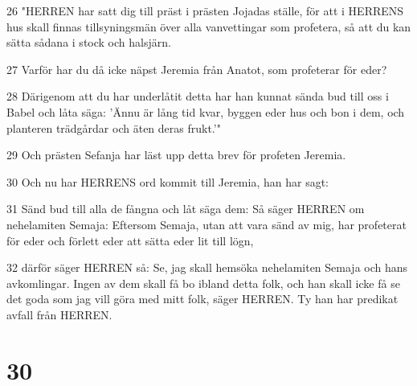 \par 26 "HERREN har satt dig till präst i prästen Jojadas ställe, för att i HERRENS hus skall finnas tillsyningsmän över alla vanvettingar som profetera, så att du kan sätta sådana i stock och halsjärn.
\par 27 Varför har du då icke näpst Jeremia från Anatot, som profeterar för eder?
\par 28 Därigenom att du har underlåtit detta har han kunnat sända bud till oss i Babel och låta säga: 'Ännu är lång tid kvar, byggen eder hus och bon i dem, och planteren trädgårdar och äten deras frukt.'"
\par 29 Och prästen Sefanja har läst upp detta brev för profeten Jeremia.
\par 30 Och nu har HERRENS ord kommit till Jeremia, han har sagt:
\par 31 Sänd bud till alla de fångna och låt säga dem: Så säger HERREN om nehelamiten Semaja: Eftersom Semaja, utan att vara sänd av mig, har profeterat för eder och förlett eder att sätta eder lit till lögn,
\par 32 därför säger HERREN så: Se, jag skall hemsöka nehelamiten Semaja och hans avkomlingar. Ingen av dem skall få bo ibland detta folk, och han skall icke få se det goda som jag vill göra med mitt folk, säger HERREN. Ty han har predikat avfall från HERREN.

\chapter{30}


